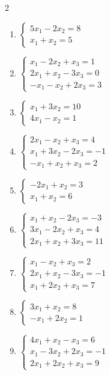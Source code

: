 \begin{multicols}{2}
\begin{enumerate}[label=\arabic*., leftmargin=*]
\item $\begin{cases}5x_1-2x_2=8\\x_1+x_2=5\end{cases}$

\item $\begin{cases}x_1-2x_2+x_3=1\\2x_1+x_2-3x_3=0\\-x_1-x_2+2x_3=3\end{cases}$

\item $\begin{cases}x_1+3x_2=10\\4x_1-x_2=1\end{cases}$

\item $\begin{cases}2x_1-x_2+x_3=4\\x_1+3x_2-2x_3=-1\\-x_1+x_2+x_3=2\end{cases}$

\item $\begin{cases}-2x_1+x_2=3\\x_1+x_2=6\end{cases}$

\item $\begin{cases}x_1+x_2-2x_3=-3\\3x_1-2x_2+x_3=4\\2x_1+x_2+3x_3=11\end{cases}$

\item $\begin{cases}x_1-x_2+x_3=2\\2x_1+x_2-3x_3=-1\\x_1+2x_2+x_3=7\end{cases}$

\item $\begin{cases}3x_1+x_2=8\\-x_1+2x_2=1\end{cases}$

\item $\begin{cases}4x_1+x_2-x_3=6\\x_1-3x_2+2x_3=-1\\2x_1+2x_2+x_3=9\end{cases}$


\end{enumerate}
\end{multicols}

